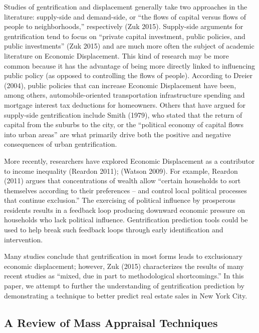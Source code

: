 \documentclass[12pt,]{article}
\begin{document}
Studies of gentrification and displacement generally take two approaches
in the literature: supply-side and demand-side, or ``the flows of
capital versus flows of people to neighborhoods,'' respectively (Zuk
2015). Supply-side arguments for gentrification tend to focus on
``private capital investment, public policies, and public investments''
(Zuk 2015) and are much more often the subject of academic literature on
Economic Displacement. This kind of research may be more common because
it has the advantage of being more directly linked to influencing public
policy (as opposed to controlling the flows of people). According to
Dreier (2004), public policies that can increase Economic Displacement
have been, among others, automobile-oriented transportation
infrastructure spending and mortgage interest tax deductions for
homeowners. Others that have argued for supply-side gentrification
include Smith (1979), who stated that the return of capital from the
suburbs to the city, or the ``political economy of capital flows into
urban areas'' are what primarily drive both the positive and negative
consequences of urban gentrification.

More recently, researchers have explored Economic Displacement as a
contributor to income inequality (Reardon 2011); (Watson 2009). For
example, Reardon (2011) argues that concentrations of wealth allow
``certain households to sort themselves according to their preferences
-- and control local political processes that continue exclusion.'' The
exercising of political influence by prosperous residents results in a
feedback loop producing downward economic pressure on households who
lack political influence. Gentrification prediction tools could be used
to help break such feedback loops through early identification and
intervention.

Many studies conclude that gentrification in most forms leads to
exclusionary economic displacement; however, Zuk (2015) characterizes
the results of many recent studies as ``mixed, due in part to
methodological shortcomings.'' In this paper, we attempt to further the
understanding of gentrification prediction by demonstrating a technique
to better predict real estate sales in New York City.

\hypertarget{a-review-of-mass-appraisal-techniques}{%
\subsection{A Review of Mass Appraisal
Techniques}\label{a-review-of-mass-appraisal-techniques}}
\end{document}
